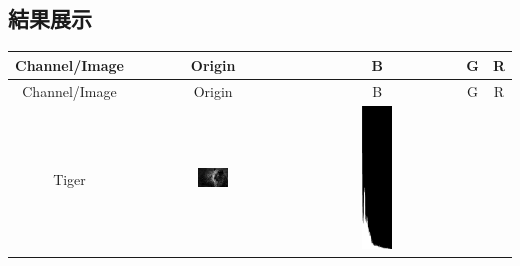 \documentclass[12pt,a4paper]{article}
\begin{document}
\subsection{結果展示}
\begin{center}
\begin{longtable}{|c|c|c|c|c|}
\hline
Channel/Image & Origin & B & G & R \\
\hline
\endfirsthead

\hline
Channel/Image & Origin & B & G & R \\
\hline
\endhead

Tiger & \includegraphics[width=0.2\textwidth]{./latexSource/tiger_origin.png} & 
       \includegraphics[width=0.2\textwidth]{./latexSource/tiger_B_HIS.png} & 

\end{longtable}
\end{center}
\end{document}
